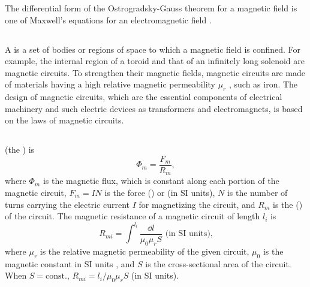 The differential form of the Ostrogradsky-Gauss theorem for a magnetic field is one of Maxwell's equations for an electromagnetic field .

\subsection{}\label{23.5.7} A  is a set of bodies or regions of space to which a magnetic field is confined. For example, the internal region of a toroid  and that of an infinitely long solenoid  are magnetic circuits. To strengthen their magnetic fields, magnetic circuits are made of materials having a high relative magnetic permeability $\mu_{r}$ , such as iron. The design of magnetic circuits, which are the essential components of electrical machinery and such electric devices as transformers and electromagnets, is based on the laws of magnetic circuits. 

\subsection{}\label{23.5.8}  (the ) is 
\begin{equation*}%
\Phi_{m} = \frac{F_{m}}{R_{m}},
\end{equation*}
where $\Phi_{m}$ is the magnetic flux, which is constant along each portion of the magnetic circuit, $F_{m} = IN$ is the  force () or  (in SI units), $N$ is the number of turns carrying the electric current $I$ for magnetizing the circuit, and $R_{m}$ is the  () of the circuit. The magnetic resistance of a magnetic circuit of length $l_{i}$ is
\begin{equation*}%
R_{mi} = \int^{l_{i}} \frac{\dd l}{\mu_{0}\mu_{r}S}\,\, \text{(in SI units),}
\end{equation*}
where $\mu_{r}$ is the relative magnetic permeability of the given circuit, $\mu_{0}$ is the magnetic constant in SI units , and $S$ is the cross-sectional area of the circuit. When $S = \text{const.}$,
$R_{mi} = l_{i}/\mu_{0}\mu_{r}S$ (in SI units).

